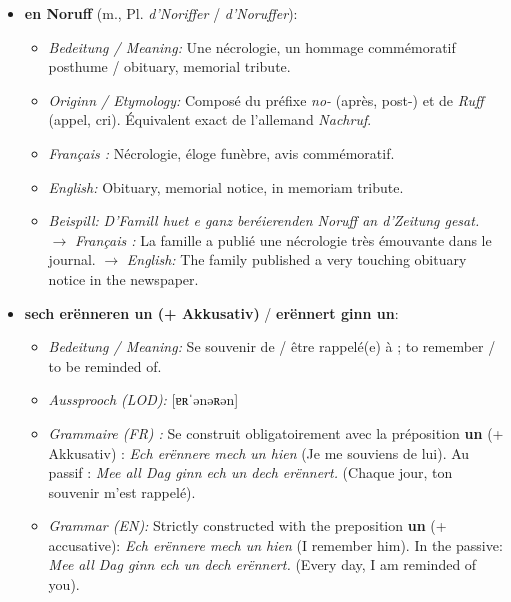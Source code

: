 \begin{itemize}
    \item \textbf{en Noruff} (m., Pl. \textit{d'Noriffer} / \textit{d'Noruffer}):
    \begin{itemize}
        \item \textit{Bedeitung / Meaning:} Une nécrologie, un hommage commémoratif posthume / obituary, memorial tribute.
        \item \textit{Originn / Etymology:} Composé du préfixe \textit{no-} (après, post-) et de \textit{Ruff} (appel, cri). Équivalent exact de l'allemand \textit{Nachruf}.
        \item \textit{Français :} Nécrologie, éloge funèbre, avis commémoratif.
        \item \textit{English:} Obituary, memorial notice, in memoriam tribute.
        \item \textit{Beispill:} \textit{D'Famill huet e ganz beréierenden Noruff an d'Zeitung gesat.}
        $\rightarrow$ \textit{Français :} La famille a publié une nécrologie très émouvante dans le journal.
        $\rightarrow$ \textit{English:} The family published a very touching obituary notice in the newspaper.
    \end{itemize}

    \vspace{0.6em}

    \item \textbf{sech erënneren un (+ Akkusativ)} / \textbf{erënnert ginn un}:
    \begin{itemize}
        \item \textit{Bedeitung / Meaning:} Se souvenir de / être rappelé(e) à ; to remember / to be reminded of.
        \item \textit{Aussprooch (LOD):} [ɐʀˈənəʀən]
        \item \textit{Grammaire (FR) :} Se construit obligatoirement avec la préposition \textbf{un} (+ Akkusativ) : \textit{Ech erënnere mech un hien} (Je me souviens de lui). Au passif : \textit{Mee all Dag ginn ech un dech erënnert.} (Chaque jour, ton souvenir m'est rappelé).
        \item \textit{Grammar (EN):} Strictly constructed with the preposition \textbf{un} (+ accusative): \textit{Ech erënnere mech un hien} (I remember him). In the passive: \textit{Mee all Dag ginn ech un dech erënnert.} (Every day, I am reminded of you).
    \end{itemize}

    \vspace{0.6em}


\end{itemize}
